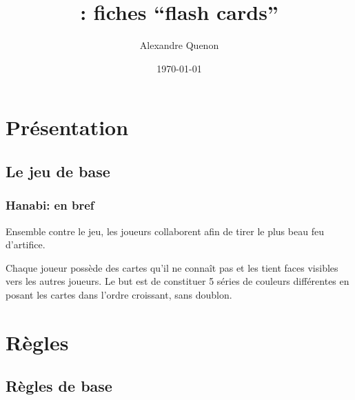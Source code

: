 \documentclass[11pt]{beamer}
\title[\thegame{} : fiches]{\thegame{}: fiches \enquote{flash cards}}
\author[A. Quenon]{Alexandre Quenon}
\date{\today}
\newcommand*{\thegame}{Hanabi}
\begin{document}
\frame{\titlepage}


\begin{frame}
	\tableofcontents
\end{frame}



\section{Présentation}


\subsection{Le jeu de base}

	\begin{frame}
		\frametitle{\thegame{}: en bref}
		
		
		Ensemble contre le jeu, les joueurs collaborent afin de tirer le plus beau feu d'artifice.
		
		
		\vspace*{2ex}
		
		
		
		Chaque joueur possède des cartes qu'il ne connaît pas et les tient faces visibles vers les autres joueurs.
		Le but est de constituer 5 séries de couleurs différentes en posant les cartes dans l'ordre croissant, sans doublon.
	\end{frame}


%
%		
%
%
%
\section{Règles}


\subsection{Règles de base}
\end{document}
